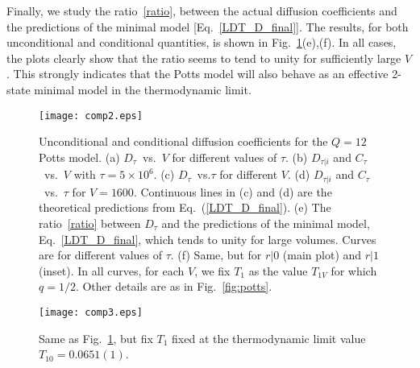 \documentclass[aps,pre,reprint, amsmath, amssymb,superscriptaddress]{revtex4-1}
\begin{document}
Finally, we study the ratio~\eqref{ratio}, between the actual diffusion coefficients and the predictions of the minimal model [Eq.~\eqref{LDT_D_final}]. 
The results, for both unconditional and conditional quantities, is shown in Fig.~\ref{fig2q}(e),(f).
In all cases, the plots clearly show that the ratio seems to tend to unity for sufficiently large $V$. 
This strongly indicates that the Potts model will also behave as an effective 2-state minimal model in the thermodynamic limit.

\begin{figure}
    \centering
    \texttt{[image: comp2.eps]}
    \caption{Unconditional and conditional diffusion coefficients for the $Q=12$ Potts model. 
    (a) $D_\tau$~vs.~$V$ for different values of $\tau$. 
    (b) $D_{\tau|i}$ and $C_\tau$~vs.~$V$ with $\tau = 5 \times 10^6$. 
    (c) $D_\tau$~vs.$\tau$ for different $V$. 
    (d) $D_{\tau|i}$ and $C_\tau$~vs.~$\tau$ for $V = 1600$. Continuous lines in (c) and (d) are the theoretical predictions from Eq.~(\ref{LDT_D_final}).
    (e) The ratio~\eqref{ratio} between $D_\tau$ and the predictions of the minimal model, Eq.~\eqref{LDT_D_final}, which tends to unity for large volumes. Curves are for different values of $\tau$. 
    (f) Same, but for $r|0$ (main plot) and $r|1$ (inset). 
    In all curves, for each $V$, we fix $T_1$ as the value $T_{1V}$ for which $q=1/2$. 
    Other details are as in Fig.~\ref{fig:potts}. 
    }
    \label{fig2q}
\end{figure}



\begin{figure}
    \centering
    \texttt{[image: comp3.eps]}
    \caption{Same as Fig.~\ref{fig2q}, but fix $T_1$ fixed at the thermodynamic limit value $T_{10} = 0.0651(1)$. 
    }
    \label{fig2q2}
\end{figure}
\end{document}
